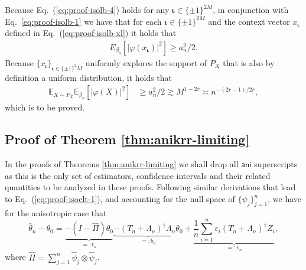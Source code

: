 \documentclass[11pt,a4paper]{article}
\renewcommand{\hat}{\widehat}
\newcommand{\vct}{\boldsymbol}
\theoremstyle{definition}
\theoremstyle{plain}
\theoremstyle{remark}
\newcommand{\ani}{\mathsf{ani}}
\newcommand{\pd}[1]{
	{ \color{blue} PD: #1}
}
\begin{document}
{\color{magenta}
Because Eq.~(\ref{eq:proof-isolb-4}) holds for any $\vct\iota\in\{\pm 1\}^{2M}$, in conjunction with Eq.~\eqref{eq:proof-isolb-1} we have that for each $\vct\iota\in\{\pm 1\}^{2M}$ and the context vector $x_{\vct\iota}$ 
defined in Eq.~(\ref{eq:proof-isolb-xl}) it holds that
\begin{align*}
    E_{\beta_o}[|\varphi(x_{\vct\iota})|^2] \geq a_n^2/2.
\end{align*}
Because $\{x_{\vct\iota}\}_{\vct\iota\in\{\pm 1\}^2M}$ uniformly explores the support of $P_X$ that is also by definition a uniform distribution, it holds that
\begin{align*}
{\mathbb E_{X\sim P_X} \mathbb E_{\beta_o}[|\varphi(X)|^2] } &\geq a_n^2/2 \gtrsim M^{1-2r} \asymp n^{-(2r-1)/2r},
\end{align*}
}
which is to be proved.



\subsection{Proof of Theorem \ref{thm:anikrr-limiting}}

In the proofs of Theorems \ref{thm:anikrr-limiting} we shall drop all $\ani$ superscripts as this is the only set of estimators, confidence intervals and their related quantities to be analyzed in these proofs.
Following similar derivations that lead to Eq.~(\ref{eq:proof-isoclt-1}), and accounting for the null space of $\{\hat\psi_j\}_{j=1}^n$, we have for the anisotropic case that
\begin{equation}
\hat\theta_n-\theta_0 =\underbrace{-(I-\hat\Pi)\theta_0}_{=:t_n}\underbrace{- (T_n+\Lambda_n)^{\dagger}\Lambda_n\theta_0}_{=: b_n} + \underbrace{\frac{1}{n}\sum_{i=1}^n\varepsilon_i(T_n+\Lambda_n)^{\dagger}Z_i}_{=:v_n},
\label{eq:proof-aniclt-1}
\end{equation}
where $\hat\Pi = \sum_{j=1}^n\hat\psi_j\otimes\hat\psi_j$.
\end{document}
